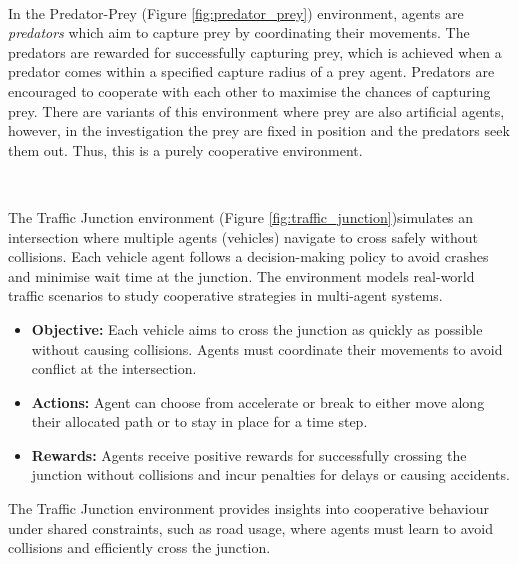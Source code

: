 \documentclass{article}
\begin{document}
\

In the Predator-Prey (Figure \ref{fig:predator_prey}) environment, agents are \emph{predators} which aim to capture prey by coordinating their movements. The predators are rewarded for successfully capturing prey, which is achieved when a predator comes within a specified capture radius of a prey agent. Predators are encouraged to cooperate with each other to maximise the chances of capturing prey. There are variants of this environment where prey are also artificial agents, however, in the investigation the prey are fixed in position and the predators seek them out. Thus, this is a purely cooperative environment.

\

The Traffic Junction environment (Figure \ref{fig:traffic_junction})simulates an intersection where multiple agents (vehicles) navigate to cross safely without collisions. Each vehicle agent follows a decision-making policy to avoid crashes and minimise wait time at the junction. The environment models real-world traffic scenarios to study cooperative strategies in multi-agent systems.

\begin{itemize}
    \item \textbf{Objective:} Each vehicle aims to cross the junction as quickly as possible without causing collisions. Agents must coordinate their movements to avoid conflict at the intersection.
    \item \textbf{Actions:} Agent can choose from accelerate or break to either move along their allocated path or to stay in place for a time step. 
    \item \textbf{Rewards:} Agents receive positive rewards for successfully crossing the junction without collisions and incur penalties for delays or causing accidents.
\end{itemize}

The Traffic Junction environment provides insights into cooperative behaviour under shared constraints, such as road usage, where agents must learn to avoid collisions and efficiently cross the junction.
\end{document}
